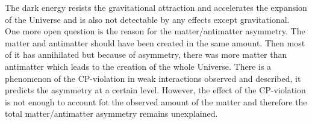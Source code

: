 The dark energy resists the gravitational attraction and accelerates the expansion of the Universe and is also not detectable by any effects except gravitational. \\

One more open question is the reason for the matter/antimatter asymmetry. The matter and antimatter should have been created in the same amount. Then most of it has annihilated but because of asymmetry, there was more matter than antimatter which leads to the creation of the whole Universe. There is a phenomenon of the CP-violation in weak interactions observed and described, it predicts the asymmetry at a certain level. However, the effect of the CP-violation is not enough to account fot the observed amount of the matter and therefore the total matter/antimatter asymmetry remains unexplained. \\


